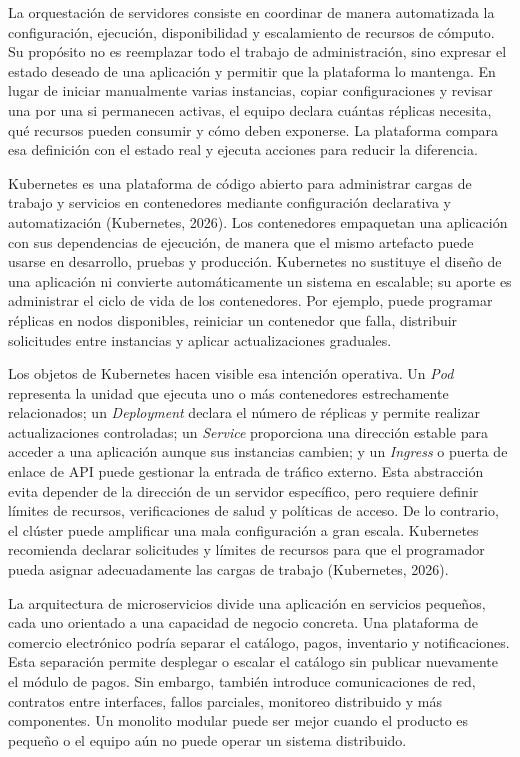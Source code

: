 \documentclass[12pt,letterpaper]{article}
\begin{document}
La orquestación de servidores consiste en coordinar de manera automatizada la configuración, ejecución, disponibilidad y escalamiento de recursos de cómputo. Su propósito no es reemplazar todo el trabajo de administración, sino expresar el estado deseado de una aplicación y permitir que la plataforma lo mantenga. En lugar de iniciar manualmente varias instancias, copiar configuraciones y revisar una por una si permanecen activas, el equipo declara cuántas réplicas necesita, qué recursos pueden consumir y cómo deben exponerse. La plataforma compara esa definición con el estado real y ejecuta acciones para reducir la diferencia.

Kubernetes es una plataforma de código abierto para administrar cargas de trabajo y servicios en contenedores mediante configuración declarativa y automatización (Kubernetes, 2026). Los contenedores empaquetan una aplicación con sus dependencias de ejecución, de manera que el mismo artefacto puede usarse en desarrollo, pruebas y producción. Kubernetes no sustituye el diseño de una aplicación ni convierte automáticamente un sistema en escalable; su aporte es administrar el ciclo de vida de los contenedores. Por ejemplo, puede programar réplicas en nodos disponibles, reiniciar un contenedor que falla, distribuir solicitudes entre instancias y aplicar actualizaciones graduales.

Los objetos de Kubernetes hacen visible esa intención operativa. Un \textit{Pod} representa la unidad que ejecuta uno o más contenedores estrechamente relacionados; un \textit{Deployment} declara el número de réplicas y permite realizar actualizaciones controladas; un \textit{Service} proporciona una dirección estable para acceder a una aplicación aunque sus instancias cambien; y un \textit{Ingress} o puerta de enlace de API puede gestionar la entrada de tráfico externo. Esta abstracción evita depender de la dirección de un servidor específico, pero requiere definir límites de recursos, verificaciones de salud y políticas de acceso. De lo contrario, el clúster puede amplificar una mala configuración a gran escala. Kubernetes recomienda declarar solicitudes y límites de recursos para que el programador pueda asignar adecuadamente las cargas de trabajo (Kubernetes, 2026).

La arquitectura de microservicios divide una aplicación en servicios pequeños, cada uno orientado a una capacidad de negocio concreta. Una plataforma de comercio electrónico podría separar el catálogo, pagos, inventario y notificaciones. Esta separación permite desplegar o escalar el catálogo sin publicar nuevamente el módulo de pagos. Sin embargo, también introduce comunicaciones de red, contratos entre interfaces, fallos parciales, monitoreo distribuido y más componentes. Un monolito modular puede ser mejor cuando el producto es pequeño o el equipo aún no puede operar un sistema distribuido.
\end{document}
